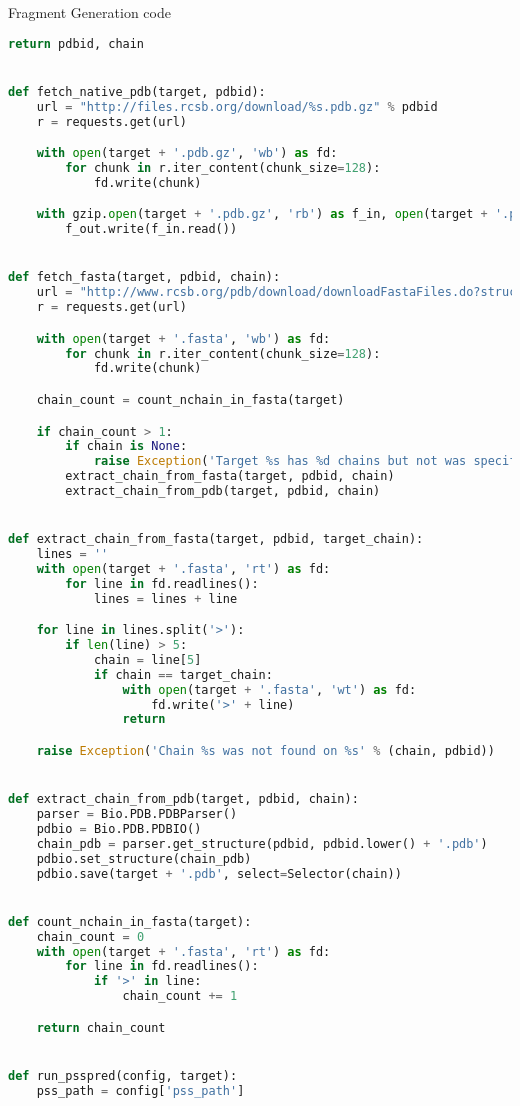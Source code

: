 \begin{section}{Fragment Generation code}
\begin{lstlisting}[language=Python]
    return pdbid, chain


def fetch_native_pdb(target, pdbid):
    url = "http://files.rcsb.org/download/%s.pdb.gz" % pdbid
    r = requests.get(url)

    with open(target + '.pdb.gz', 'wb') as fd:
        for chunk in r.iter_content(chunk_size=128):
            fd.write(chunk)

    with gzip.open(target + '.pdb.gz', 'rb') as f_in, open(target + '.pdb', 'wb') as f_out:
        f_out.write(f_in.read())


def fetch_fasta(target, pdbid, chain):
    url = "http://www.rcsb.org/pdb/download/downloadFastaFiles.do?structureIdList=%s&compressionType=uncompressed" % pdbid
    r = requests.get(url)

    with open(target + '.fasta', 'wb') as fd:
        for chunk in r.iter_content(chunk_size=128):
            fd.write(chunk)

    chain_count = count_nchain_in_fasta(target)

    if chain_count > 1:
        if chain is None:
            raise Exception('Target %s has %d chains but not was specified' % (pdbid, chain_count))
        extract_chain_from_fasta(target, pdbid, chain)
        extract_chain_from_pdb(target, pdbid, chain)


def extract_chain_from_fasta(target, pdbid, target_chain):
    lines = ''
    with open(target + '.fasta', 'rt') as fd:
        for line in fd.readlines():
            lines = lines + line

    for line in lines.split('>'):
        if len(line) > 5:
            chain = line[5]
            if chain == target_chain:
                with open(target + '.fasta', 'wt') as fd:
                    fd.write('>' + line)
                return

    raise Exception('Chain %s was not found on %s' % (chain, pdbid))


def extract_chain_from_pdb(target, pdbid, chain):
    parser = Bio.PDB.PDBParser()
    pdbio = Bio.PDB.PDBIO()
    chain_pdb = parser.get_structure(pdbid, pdbid.lower() + '.pdb')
    pdbio.set_structure(chain_pdb)
    pdbio.save(target + '.pdb', select=Selector(chain))


def count_nchain_in_fasta(target):
    chain_count = 0
    with open(target + '.fasta', 'rt') as fd:
        for line in fd.readlines():
            if '>' in line:
                chain_count += 1

    return chain_count


def run_psspred(config, target):
    pss_path = config['pss_path']


\end{lstlisting}
\end{section}
